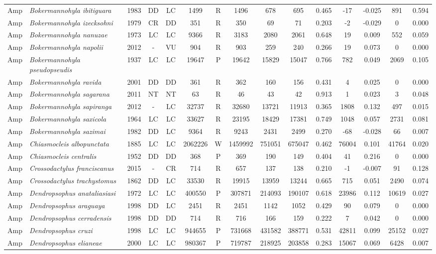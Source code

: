\documentclass[12pt,openright,oneside,a4paper,english]{abntex2}
\begin{document}
\begin{landscape}
\begin{longtable}{llccccccccccccc}
		Amp&\textit{Bokermannohyla ibitiguara}&1983&DD&LC&1499&R&1496&678&695&0.465&-17&-0.025&891&0.594\\
		Amp&\textit{Bokermannohyla izecksohni}&1979&CR&DD&351&R&350&69&71&0.203&-2&-0.029&0&0.000\\
		Amp&\textit{Bokermannohyla nanuzae}&1973&LC&LC&9366&R&3183&2080&2061&0.648&19&0.009&552&0.059\\
		Amp&\textit{Bokermannohyla napolii}&2012&-&VU&904&R&903&259&240&0.266&19&0.073&0&0.000\\
		Amp&\textit{Bokermannohyla pseudopseudis}&1937&LC&LC&19647&P&19642&15829&15047&0.766&782&0.049&2069&0.105\\
		Amp&\textit{Bokermannohyla ravida}&2001&DD&DD&361&R&362&160&156&0.431&4&0.025&0&0.000\\
		Amp&\textit{Bokermannohyla sagarana}&2011&NT&NT&63&R&46&43&42&0.913&1&0.023&3&0.048\\
		Amp&\textit{Bokermannohyla sapiranga}&2012&-&LC&32737&R&32680&13721&11913&0.365&1808&0.132&497&0.015\\
		Amp&\textit{Bokermannohyla saxicola}&1964&LC&LC&33627&R&23195&18429&17381&0.749&1048&0.057&2731&0.081\\
		Amp&\textit{Bokermannohyla sazimai}&1982&DD&LC&9364&R&9243&2431&2499&0.270&-68&-0.028&66&0.007\\
		Amp&\textit{Chiasmocleis albopunctata}&1885&LC&LC&2062226&W&1459992&751051&675047&0.462&76004&0.101&41764&0.020\\
		Amp&\textit{Chiasmocleis centralis}&1952&DD&DD&368&P&369&190&149&0.404&41&0.216&0&0.000\\
		Amp&\textit{Crossodactylus franciscanus}&2015&-&CR&714&R&657&137&138&0.210&-1&-0.007&91&0.128\\
		Amp&\textit{Crossodactylus trachystomus}&1862&DD&LC&33530&R&19915&13959&13244&0.665&715&0.051&2490&0.074\\
		Amp&\textit{Dendropsophus anataliasiasi}&1972&LC&LC&400550&P&307871&214093&190107&0.618&23986&0.112&10619&0.027\\
		Amp&\textit{Dendropsophus araguaya}&1998&DD&LC&2451&R&2451&1142&1052&0.429&90&0.079&0&0.000\\
		Amp&\textit{Dendropsophus cerradensis}&1998&DD&DD&714&R&716&166&159&0.222&7&0.042&0&0.000\\
		Amp&\textit{Dendropsophus cruzi}&1998&LC&LC&944655&P&731668&431582&388771&0.531&42811&0.099&25152&0.027\\
		Amp&\textit{Dendropsophus elianeae}&2000&LC&LC&980367&P&719787&218925&203858&0.283&15067&0.069&6428&0.007\\

\end{longtable}
\end{landscape}
\end{document}

